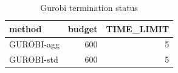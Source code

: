 \begin{table}[htbp]
\centering
\small
\caption{Gurobi termination status}
\label{tab:E3x_long_runs_xlarge_gurobi_status}
\begin{tabular}{lrr}
\toprule
method & budget & TIME\_LIMIT \\
\midrule
GUROBI-agg & 600 & 5 \\
GUROBI-std & 600 & 5 \\
\bottomrule
\end{tabular}
\end{table}
